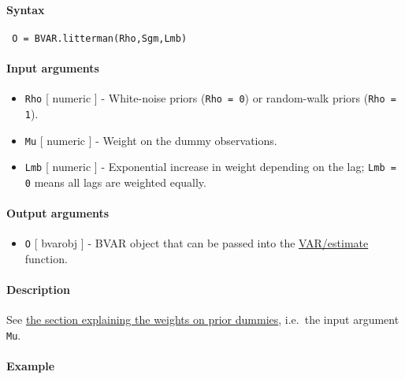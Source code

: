 


	\paragraph{Syntax}
 
 \begin{verbatim}
 O = BVAR.litterman(Rho,Sgm,Lmb)
 \end{verbatim}
 
 \paragraph{Input arguments}
 
 \begin{itemize}
 \item
   \texttt{Rho} {[} numeric {]} - White-noise priors (\texttt{Rho = 0})
   or random-walk priors (\texttt{Rho = 1}).
 \item
   \texttt{Mu} {[} numeric {]} - Weight on the dummy observations.
 \item
   \texttt{Lmb} {[} numeric {]} - Exponential increase in weight
   depending on the lag; \texttt{Lmb = 0} means all lags are weighted
   equally.
 \end{itemize}
 
 \paragraph{Output arguments}
 
 \begin{itemize}
 \item
   \texttt{O} {[} bvarobj {]} - BVAR object that can be passed into the
   \url{VAR/estimate} function.
 \end{itemize}
 
 \paragraph{Description}
 
 See \href{BVAR/Contents}{the section explaining the weights on prior
 dummies}, i.e.~the input argument \texttt{Mu}.
 
 \paragraph{Example}


